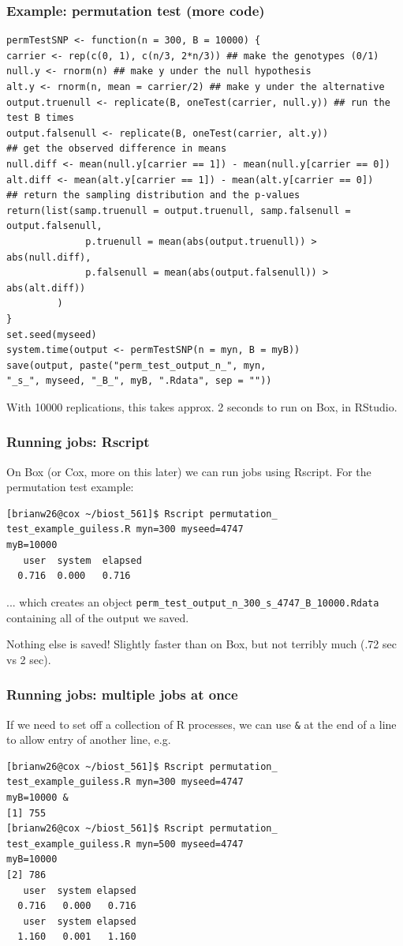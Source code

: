 \documentclass[12pt, 
hyperref={colorlinks=true, linkcolor=blue, urlcolor=cyan}]{beamer}
\begin{document}
\begin{frame}[fragile]
\frametitle{Example: permutation test (more code)}
{\scriptsize
\begin{verbatim}
permTestSNP <- function(n = 300, B = 10000) {
carrier <- rep(c(0, 1), c(n/3, 2*n/3)) ## make the genotypes (0/1)
null.y <- rnorm(n) ## make y under the null hypothesis
alt.y <- rnorm(n, mean = carrier/2) ## make y under the alternative 
output.truenull <- replicate(B, oneTest(carrier, null.y)) ## run the test B times
output.falsenull <- replicate(B, oneTest(carrier, alt.y))
## get the observed difference in means
null.diff <- mean(null.y[carrier == 1]) - mean(null.y[carrier == 0])
alt.diff <- mean(alt.y[carrier == 1]) - mean(alt.y[carrier == 0])
## return the sampling distribution and the p-values
return(list(samp.truenull = output.truenull, samp.falsenull = output.falsenull,
              p.truenull = mean(abs(output.truenull)) > abs(null.diff),
              p.falsenull = mean(abs(output.falsenull)) > abs(alt.diff))
         )
}
set.seed(myseed)
system.time(output <- permTestSNP(n = myn, B = myB))
save(output, paste("perm_test_output_n_", myn, 
"_s_", myseed, "_B_", myB, ".Rdata", sep = ""))
\end{verbatim}
}

With 10000 replications, this takes approx. 2 seconds to run on Box, in RStudio.
\end{frame}

\begin{frame}[fragile]
\frametitle{Running jobs: Rscript}
On Box (or Cox, more on this later) we can run jobs using Rscript. For the permutation test example:
\begin{verbatim}
[brianw26@cox ~/biost_561]$ Rscript permutation_
test_example_guiless.R myn=300 myseed=4747 
myB=10000
   user  system  elapsed
  0.716  0.000   0.716
\end{verbatim}
 ... which creates an object \texttt{perm\_test\_output\_n\_300\_s\_4747\_B\_10000.Rdata} containing all of the output we saved.

Nothing else is saved! Slightly faster than on Box, but not terribly much (.72 sec vs 2 sec).
\end{frame}

\begin{frame}[fragile]
\frametitle{Running jobs: multiple jobs at once}
If we need to set off a collection of R processes, we can use \texttt{\&} at the end of a line to allow entry of another line, e.g. 
{\scriptsize
\begin{verbatim}
[brianw26@cox ~/biost_561]$ Rscript permutation_
test_example_guiless.R myn=300 myseed=4747 
myB=10000 &
[1] 755
[brianw26@cox ~/biost_561]$ Rscript permutation_
test_example_guiless.R myn=500 myseed=4747 
myB=10000 
[2] 786
   user  system elapsed
  0.716   0.000   0.716
   user  system elapsed
  1.160   0.001   1.160
\end{verbatim}
}
\end{frame}
\end{document}
